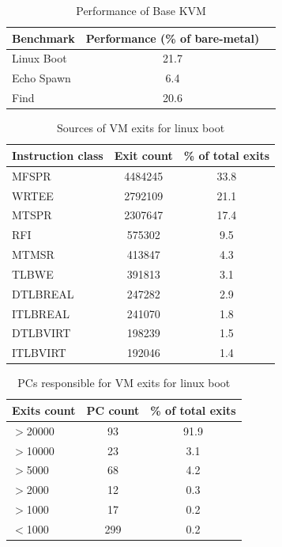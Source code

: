 \documentclass[10pt,twocolumn]{article}
\begin{document}
\begin{table}[!b]
\centering
\caption{Performance of Base KVM}
     \begin{tabular}{lcc} \hline
       Benchmark  & Performance (\% of bare-metal) \\ \hline
       Linux Boot & 21.7 \\
       Echo Spawn & 6.4 \\
       Find & 20.6 \\
       \hline
     \end{tabular}
\label{tab:kvmperformance}
\end{table}


\begin{table}[!b]
\centering
\caption{Sources of VM exits for linux boot}
     \begin{tabular}{lcc} \hline
       Instruction class  & Exit count & \% of total exits  \\ \hline
       MFSPR & 4484245 & 33.8  \\
       WRTEE & 2792109 & 21.1  \\
       MTSPR & 2307647 & 17.4  \\
       RFI & 575302 & 9.5 \\
       MTMSR & 413847 & 4.3 \\
       TLBWE & 391813 & 3.1 \\
       DTLBREAL & 247282 & 2.9 \\
       ITLBREAL & 241070 & 1.8 \\
       DTLBVIRT & 198239 & 1.5 \\
       ITLBVIRT & 192046 & 1.4 \\
       \hline
     \end{tabular}
\label{tab:NumExitsBase}
\end{table}

\begin{table}[!b]
\centering
\caption{PCs responsible for VM exits for linux boot}
     \begin{tabular}{lcc} \hline
       Exits count  & PC count & \% of total exits  \\ \hline
       $>$20000 & 93 & 91.9  \\
       $>$10000 & 23 & 3.1  \\
       $>$5000 & 68 & 4.2  \\
       $>$2000 & 12 & 0.3 \\
       $>$1000 & 17 & 0.2 \\
       $<$1000 & 299 & 0.2 \\
       \hline
     \end{tabular}
\label{tab:NumPCBase}
\end{table}
\end{document}

